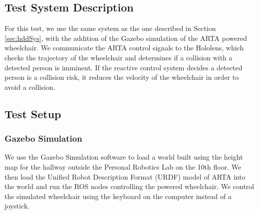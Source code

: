 \subsection{Test System Description}
For this test, we use the same system as the one described in Section \ref{sec:hddSys}, with the addition of the Gazebo simulation of the ARTA powered wheelchair. We communicate the ARTA control signals to the Hololens, which checks the trajectory of the wheelchair and determines if a collision with a detected person is imminent. If the reactive control system decides a detected person is a collision risk, it reduces the velocity of the wheelchair in order to avoid a collision.

\subsection{Test Setup}

\subsubsection{Gazebo Simulation}
We use the Gazebo Simulation software to load a world built using the height map for the hallway outside the Personal Robotics Lab on the 10th floor. We then load the Unified Robot Description Format (URDF) model of ARTA into the world and run the ROS nodes controlling the powered wheelchair. We control the simulated wheelchair using the keyboard on the computer instead of a joystick.


